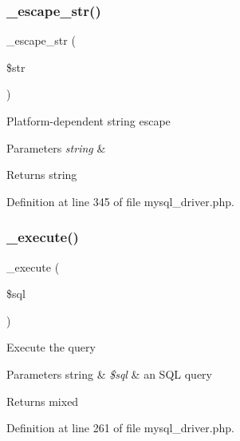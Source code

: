 \subsubsection{\texorpdfstring{\_escape\_str()}{\_escape\_str()}}
{\footnotesize\ttfamily \+\_\+escape\+\_\+str (\begin{DoxyParamCaption}\item[{}]{\$str }\end{DoxyParamCaption})\hspace{0.3cm}{\ttfamily [protected]}}

Platform-\/dependent string escape


\begin{DoxyParams}{Parameters}
{\em string} & \\
\hline
\end{DoxyParams}
\begin{DoxyReturn}{Returns}
string 
\end{DoxyReturn}


Definition at line 345 of file mysql\+\_\+driver.\+php.

\mbox{\label{class_c_i___d_b__mysql__driver_a114ab675d89bf8324a41785fb475e86d}} 
\subsubsection{\texorpdfstring{\_execute()}{\_execute()}}
{\footnotesize\ttfamily \+\_\+execute (\begin{DoxyParamCaption}\item[{}]{\$sql }\end{DoxyParamCaption})\hspace{0.3cm}{\ttfamily [protected]}}

Execute the query


\begin{DoxyParams}[1]{Parameters}
string & {\em \$sql} & an S\+QL query \\
\hline
\end{DoxyParams}
\begin{DoxyReturn}{Returns}
mixed 
\end{DoxyReturn}


Definition at line 261 of file mysql\+\_\+driver.\+php.

\mbox{\label{class_c_i___d_b__mysql__driver_aef43f7e3e7b71d337ff3724c5eb14f10}} 
